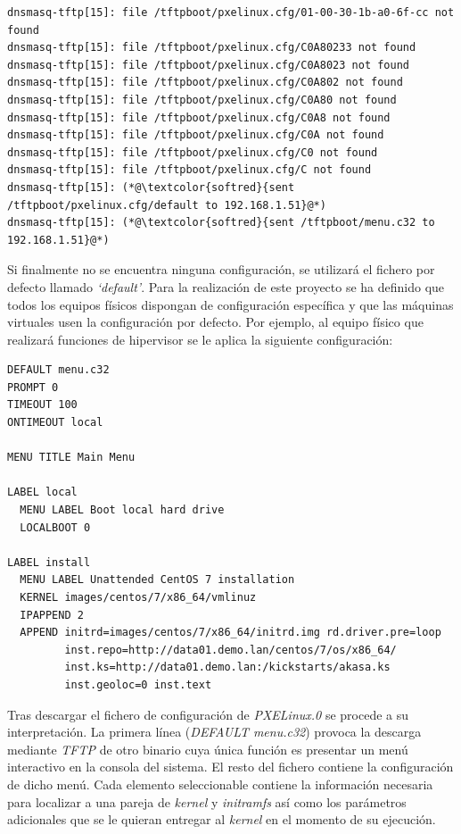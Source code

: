 \documentclass[a4paper,12pt,spanish,final]{epsc_tfc_pfc}
\begin{document}
\begin{lstlisting}[style=dnsmasq]
dnsmasq-tftp[15]: file /tftpboot/pxelinux.cfg/01-00-30-1b-a0-6f-cc not found
dnsmasq-tftp[15]: file /tftpboot/pxelinux.cfg/C0A80233 not found
dnsmasq-tftp[15]: file /tftpboot/pxelinux.cfg/C0A8023 not found
dnsmasq-tftp[15]: file /tftpboot/pxelinux.cfg/C0A802 not found
dnsmasq-tftp[15]: file /tftpboot/pxelinux.cfg/C0A80 not found
dnsmasq-tftp[15]: file /tftpboot/pxelinux.cfg/C0A8 not found
dnsmasq-tftp[15]: file /tftpboot/pxelinux.cfg/C0A not found
dnsmasq-tftp[15]: file /tftpboot/pxelinux.cfg/C0 not found
dnsmasq-tftp[15]: file /tftpboot/pxelinux.cfg/C not found
dnsmasq-tftp[15]: (*@\textcolor{softred}{sent /tftpboot/pxelinux.cfg/default to 192.168.1.51}@*)
dnsmasq-tftp[15]: (*@\textcolor{softred}{sent /tftpboot/menu.c32 to 192.168.1.51}@*)
\end{lstlisting}

Si finalmente no se encuentra ninguna configuración, se utilizará el fichero por defecto llamado \emph{`default'}. Para la realización de este proyecto se ha definido que todos los equipos físicos dispongan de configuración específica y que las máquinas virtuales usen la configuración por defecto. Por ejemplo, al equipo físico que realizará funciones de hipervisor se le aplica la siguiente configuración:\\

\begin{lstlisting}[style=dnsmasq]
DEFAULT menu.c32
PROMPT 0
TIMEOUT 100
ONTIMEOUT local

MENU TITLE Main Menu

LABEL local
  MENU LABEL Boot local hard drive
  LOCALBOOT 0

LABEL install
  MENU LABEL Unattended CentOS 7 installation
  KERNEL images/centos/7/x86_64/vmlinuz
  IPAPPEND 2
  APPEND initrd=images/centos/7/x86_64/initrd.img rd.driver.pre=loop
         inst.repo=http://data01.demo.lan/centos/7/os/x86_64/
         inst.ks=http://data01.demo.lan:/kickstarts/akasa.ks
         inst.geoloc=0 inst.text
\end{lstlisting}

Tras descargar el fichero de configuración de \emph{PXELinux.0} se procede a su interpretación. La primera línea (\emph{DEFAULT menu.c32}) provoca la descarga mediante \emph{TFTP} de otro binario cuya única función es presentar un menú interactivo en la consola del sistema. El resto del fichero contiene la configuración de dicho menú. Cada elemento seleccionable contiene la información necesaria para localizar a una pareja de \emph{kernel} y \emph{initramfs} así como los parámetros adicionales que se le quieran entregar al \emph{kernel} en el momento de su ejecución.
\end{document}
